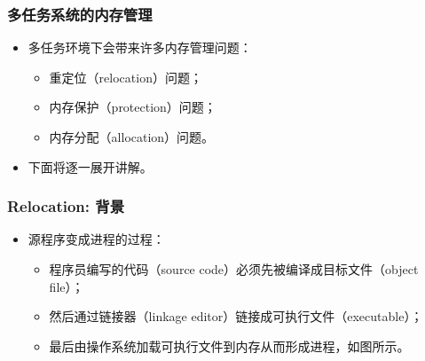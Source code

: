 \documentclass[CJKutf8,xcolor=pdftex,dvipsnames,table]{beamer}
\begin{document}
\begin{CJK*}{UTF8}{song}
  \begin{frame}
  \frametitle{多任务系统的内存管理} \pause
  \begin{itemize}
  \item{多任务环境下会带来许多内存管理问题：} \pause
    \begin{itemize}
    \item{重定位（relocation）问题；} \pause
    \item{内存保护（protection）问题；} \pause
    \item{内存分配（allocation）问题。} \pause
    \end{itemize}
  \item{下面将逐一展开讲解。}
  \end{itemize}
  \end{frame}

  \begin{frame}
  \frametitle{Relocation: 背景} \pause
  \begin{minipage}[c]{0.6\textwidth}
    \begin{itemize}
    \item{源程序变成进程的过程：} \pause
      \begin{itemize}
      \item{程序员编写的代码（source code）必须先被编译成目标文件（object file）；} \pause
      \item{然后通过链接器（linkage editor）链接成可执行文件（executable）；} \pause
      \item{最后由操作系统加载可执行文件到内存从而形成进程，如图所示。} \pause
      \end{itemize}
    \end{itemize}
  \end{minipage}%
  \begin{minipage}[c]{0.4\textwidth}
    \centering

\end{minipage}
\end{frame}
\end{CJK*}
\end{document}
